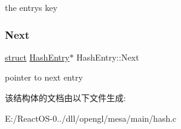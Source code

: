 the entry\textquotesingle{}s key \mbox{\label{struct_hash_entry_a7f40955c541150c373e5320cebee2227}} 
\subsubsection{\texorpdfstring{Next}{Next}}
{\footnotesize\ttfamily \hyperlink{interfacestruct}{struct} \hyperlink{struct_hash_entry}{Hash\+Entry}$\ast$ Hash\+Entry\+::\+Next}

pointer to next entry 

该结构体的文档由以下文件生成\+:\begin{DoxyCompactItemize}
\item 
E\+:/\+React\+O\+S-\/0../dll/opengl/mesa/main/hash.\+c\end{DoxyCompactItemize}
